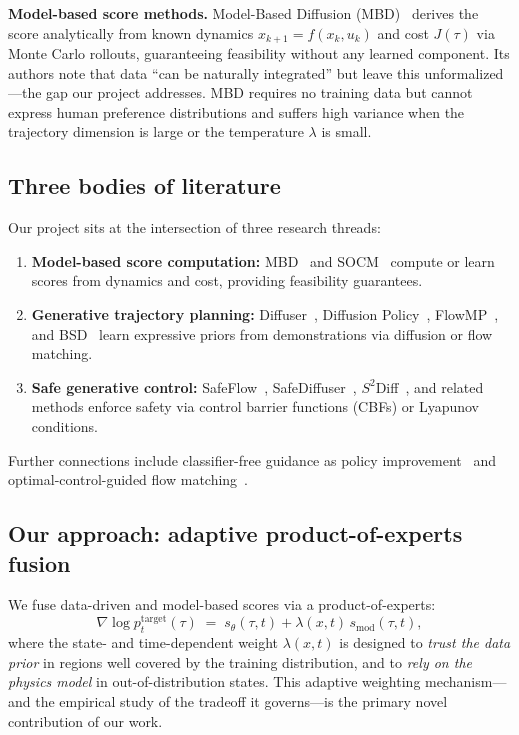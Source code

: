 \documentclass[11pt,letterpaper]{article}
\theoremstyle{plain}
\theoremstyle{definition}
\theoremstyle{remark}
\newcommand{\grad}{\nabla}
\newcommand{\smodel}{s_{\mathrm{mod}}}
\begin{document}
\textbf{Model-based score methods.}  Model-Based Diffusion
(MBD)~\citep{mbd} derives the score analytically from known dynamics
$x_{k+1}=f(x_k,u_k)$ and cost $J(\tau)$ via Monte Carlo rollouts,
guaranteeing feasibility without any learned component.  Its authors
note that data ``can be naturally integrated'' but leave this
unformalized---the gap our project addresses.  MBD requires no training
data but cannot express human preference distributions and suffers
high variance when the trajectory dimension is large or the temperature
$\lambda$ is small.

\subsection{Three bodies of literature}

Our project sits at the intersection of three research threads:
\begin{enumerate}[nosep]
  \item \textbf{Model-based score computation:}
    MBD~\citep{mbd} and SOCM~\citep{domingoenrich2024socm} compute or
    learn scores from dynamics and cost, providing feasibility
    guarantees.
  \item \textbf{Generative trajectory planning:}
    Diffuser~\citep{janner2022}, Diffusion
    Policy~\citep{chi2023diffusionpolicy}, FlowMP~\citep{flowmp},
    and BSD~\citep{bsd} learn expressive priors from demonstrations
    via diffusion or flow matching.
  \item \textbf{Safe generative control:}
    SafeFlow~\citep{safeflow}, SafeDiffuser~\citep{xiao2025safediffuser},
    $S^2$Diff~\citep{s2diff}, and related methods enforce safety via
    control barrier functions (CBFs) or Lyapunov conditions.
\end{enumerate}
Further connections include classifier-free guidance as policy
improvement~\citep{cfgrl} and optimal-control-guided flow
matching~\citep{ocflow}.

\subsection{Our approach: adaptive product-of-experts fusion}

We fuse data-driven and model-based scores via a product-of-experts:
\begin{equation}
  \grad\log p^{\mathrm{target}}_t(\tau)
  \;=\; s_\theta(\tau,t)
  + \lambda(x,t)\,\smodel(\tau,t),
  \label{eq:poe-intro}
\end{equation}
where the state- and time-dependent weight $\lambda(x,t)$ is designed
to \emph{trust the data prior} in regions well covered by the training
distribution, and to \emph{rely on the physics model} in
out-of-distribution states.  This adaptive weighting mechanism---and
the empirical study of the tradeoff it governs---is the primary novel
contribution of our work.
\end{document}

